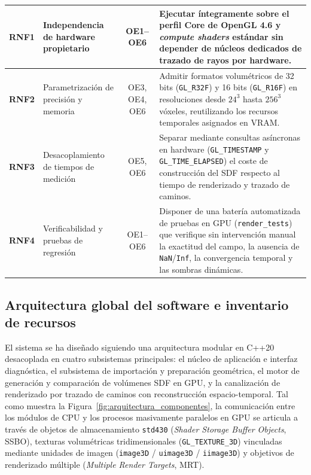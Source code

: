 \begin{table}[htbp]
\begin{tabularx}{\textwidth}{|>{\bfseries}c|>{\bfseries\raggedright\arraybackslash}p{31mm}|c|>{\raggedright\arraybackslash}X|}
    RNF1 & Independencia de hardware propietario & OE1--OE6 & Ejecutar íntegramente sobre el perfil Core de OpenGL 4.6 y \textit{compute shaders} estándar sin depender de núcleos dedicados de trazado de rayos por hardware. \\ \hline
    RNF2 & Parametrización de precisión y memoria & OE3, OE4, OE6 & Admitir formatos volumétricos de 32 bits (\texttt{GL\_R32F}) y 16 bits (\texttt{GL\_R16F}) en resoluciones desde $24^3$ hasta $256^3$ vóxeles, reutilizando los recursos temporales asignados en VRAM. \\ \hline
    RNF3 & Desacoplamiento de tiempos de medición & OE5, OE6 & Separar mediante consultas asíncronas en hardware (\texttt{GL\_TIMESTAMP} y \texttt{GL\_TIME\_ELAPSED}) el coste de construcción del SDF respecto al tiempo de renderizado y trazado de caminos. \\ \hline
    RNF4 & Verificabilidad y pruebas de regresión & OE1--OE6 & Disponer de una batería automatizada de pruebas en GPU (\texttt{render\_tests}) que verifique sin intervención manual la exactitud del campo, la ausencia de \texttt{NaN}/\texttt{Inf}, la convergencia temporal y las sombras dinámicas. \\ \hline
  \end{tabularx}
\end{table}

\subsection{Arquitectura global del software e inventario de recursos}

El sistema se ha diseñado siguiendo una arquitectura modular en C++20 desacoplada en cuatro subsistemas principales: el núcleo de aplicación e interfaz diagnóstica, el subsistema de importación y preparación geométrica, el motor de generación y comparación de volúmenes SDF en GPU, y la canalización de renderizado por trazado de caminos con reconstrucción espacio-temporal. Tal como muestra la Figura~\ref{fig:arquitectura_componentes}, la comunicación entre los módulos de CPU y los procesos masivamente paralelos en GPU se articula a través de objetos de almacenamiento \texttt{std430} (\textit{Shader Storage Buffer Objects}, SSBO), texturas volumétricas tridimensionales (\texttt{GL\_TEXTURE\_3D}) vinculadas mediante unidades de imagen (\texttt{image3D} / \texttt{uimage3D} / \texttt{iimage3D}) y objetivos de renderizado múltiple (\textit{Multiple Render Targets}, MRT).

